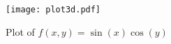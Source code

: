 \begin{figure}[H] 
  \centering
  \texttt{[image: plot3d.pdf]}
  \caption{Plot of $f(x,y)=\sin(x)\cos(y)$}
\end{figure}
